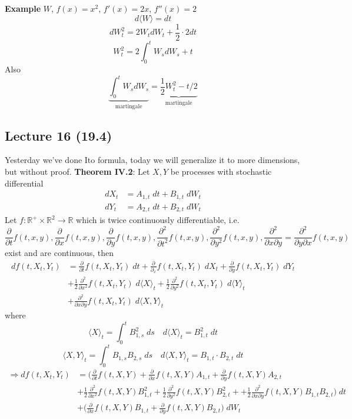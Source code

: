 \documentclass[english]{article}
\newcommand{\R}{\mathbb{R}}
\newcommand{\ub}{\underbrace}
\newcommand{\note}[1]{\noindent\textbf{#1}}
\begin{document}
\note{Example} $W$, $f(x) = x^2$, $f'(x) = 2x$, $f''(x) = 2$
$$d\langle W \rangle = dt$$
$$dW^2_t = 2W_t dW_t + \frac 12 \cdot 2 dt$$
$$W^2_t = 2 \int^t_0 W_s dW_s + t$$
Also
$$\ub{\int^t_0 W_s dW_s}_{\text{martingale}} = \ub{\frac 12 W^2_t - t/2}_{\text{martingale}}$$

\subsection*{Lecture 16 (19.4)}
Yesterday we've done Ito formula, today we will generalize it to more dimensions, but without proof.\newline
\note{Theorem IV.2}: Let $X,Y$ be processes with stochastic differential
\begin{align*}dX_t &= A_{1,t} \; dt + B_{1,t}\; dW_t \\
dY_t & = A_{2,t} \; dt + B_{2,t} \; dW_t
\end{align*}
Let $f: \R^+ \times \R^2 \to \R$ which is twice continuously differentiable, i.e.
$$\frac{\partial}{\partial t} f(t,x,y), \frac{\partial}{\partial x} f(t,x,y), \frac{\partial}{\partial y} f(t,x,y), \frac{\partial^2}{\partial t^2}f(t,x,y), \frac{\partial^2}{\partial y^2} f(t,x,y), \frac{\partial^2}{\partial x \partial y} = \frac{\partial^2}{\partial y \partial x} f(t,x,y)$$
exist and are continuous, then
\begin{align*}df(t,X_t, Y_t) &= \frac{\partial}{\partial t} f(t, X_t, Y_t) \;dt + \frac{\partial}{\partial_x} f(t,X_t, Y_t) \;dX_t + \frac{\partial }{\partial y} f(t, X_t, Y_t) \; dY_t \\
& + \frac 12 \frac{\partial^2}{\partial x^2} f(t, X_t, Y_t) \; d\langle X\rangle_t + \frac 12 \frac{\partial^2}{\partial y^2} f(t,X_t, Y_t) \; d\langle Y\rangle_t \\
&+ \frac{\partial^2}{\partial x \partial y} f(t, X_t, Y_t) \; d\langle X, Y \rangle_t
\end{align*}
where
$$\langle X \rangle_t= \int^t_0 B_{1,s}^2 \;ds \quad d\langle X \rangle_t = B^2_{1,t} \; dt$$
$$\langle X,Y \rangle_t= \int^t_0 B_{1,s} B_{2,s} \;ds \quad d\langle X,Y \rangle_t = B_{1,t} \cdot B_{2,t} \; dt$$
\begin{align*}\Rightarrow df(t,X_t, Y_t) &= \Big( \frac{\partial}{\partial t} f(t,X,Y) +\frac{\partial}{\partial x} f(t,X,Y) A_{1,t} + \frac{\partial}{\partial y} f(t,X,Y) A_{2,t} \\
&+ \frac 12 \frac{\partial^2}{\partial x^2} f(t,X,Y) B^2_{1,t} + \frac 12 \frac{\partial^2}{\partial y^2} f(t,X,Y) B^2_{2,t} + + \frac 12 \frac{\partial^2}{\partial x\partial y} f(t,X,Y) B_{1,t} B_{2,t} \Big) \;dt \\
&+\Big( \frac{\partial}{\partial x} f(t,X,Y) B_{1,t} + \frac{\partial}{\partial y} f(t,X,Y) B_{2,t} \Big) \; dW_t
\end{align*}
\end{document}
